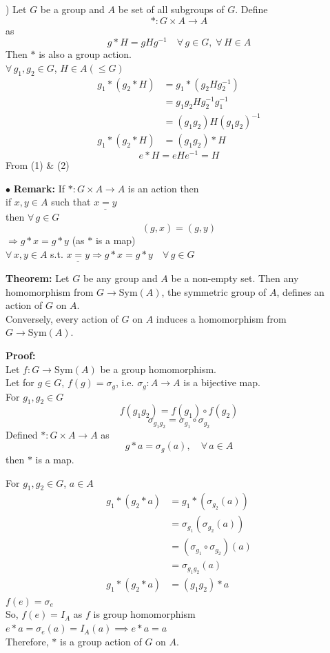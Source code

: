 \documentclass[11pt]{article}
\begin{document}
\newpage
) Let $G$ be a group and $A$ be set of all subgroups of $G$. Define
\[
* : G \times A \to A
\]
as
\[
g * H = gHg^{-1} \quad \forall\, g \in G, \; \forall\, H \in A
\]
Then $*$ is also a group action. \\
$\forall\, g_1, g_2 \in G$, $H \in A (\le G)$
\begin{align}
g_1 * (g_2 * H) &= g_1 * (g_2 H g_2^{-1}) \nonumber \\
&= g_1 g_2 H g_2^{-1} g_1^{-1} \nonumber \\
&= (g_1 g_2) H (g_1 g_2)^{-1} \nonumber \\
g_1 * (g_2 * H) &= (g_1 g_2) * H \tag{1}
\end{align}
\begin{equation}
e * H = eHe^{-1} = H \tag{2}
\end{equation}
From (1) \& (2)

\bigskip
\noindent $\bullet$ \textbf{Remark:} If $* : G \times A \to A$ is an action then \\
if $x, y \in A$ such that $\underline{x = y}$ \\
then $\forall\, g \in G$
\[
(g, x) = (g, y)
\]
$\Rightarrow g * x = g * y$ (as $*$ is a map) \\
$\forall\, x, y \in A$ s.t. $\underline{x = y} \Rightarrow g * x = g * y \quad \forall\, g \in G$

\bigskip
\noindent \textbf{Theorem:} Let $G$ be any group and $A$ be a non-empty set. Then any homomorphism from $G \to \text{Sym}(A)$, the symmetric group of $A$, defines an action of $G$ on $A$. \\
Conversely, every action of $G$ on $A$ induces a homomorphism from $G \to \text{Sym}(A)$.

\medskip
\noindent \textbf{Proof:} \\
Let $f : G \to \text{Sym}(A)$ be a group homomorphism. \\
Let for $g \in G$, $f(g) = \sigma_g$, i.e. $\sigma_g : A \to A$ is a bijective map. \\
For $g_1, g_2 \in G$
\[
f(g_1 g_2) = f(g_1) \circ f(g_2)
\]
\[
\sigma_{g_1 g_2} = \sigma_{g_1} \circ \sigma_{g_2}
\]
Defined $* : G \times A \to A$ as
\[
g * a = \sigma_g(a), \quad \forall\, a \in A
\]
then $*$ is a map.

\noindent For $g_1, g_2 \in G$, $a \in A$
\begin{align*}
g_1 * (g_2 * a) &= g_1 * (\sigma_{g_2}(a)) \\
&= \sigma_{g_1}(\sigma_{g_2}(a)) \\
&= (\sigma_{g_1} \circ \sigma_{g_2})(a) \\
&= \sigma_{g_1 g_2}(a) \\
g_1 * (g_2 * a) &= (g_1 g_2) * a
\end{align*}
$f(e) = \sigma_e$ \\
So, $f(e) = I_A$ as $f$ is group homomorphism \\
$e * a = \sigma_e(a) = I_A(a) \implies e * a = a$ \\
Therefore, $*$ is a group action of $G$ on $A$.
\end{document}
